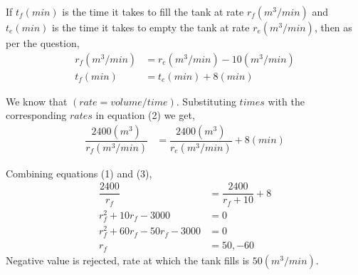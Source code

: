\begin{solution}[\halfpage]
  If $t_f(min)$ is the time it takes to fill the tank at rate $r_f(m^3/min)$ and $t_e(min)$ is the time it takes to empty the tank at rate $r_e(m^3/min)$, then as per the question,
  \begin{align}
    r_f(m^3/min) &= r_e(m^3/min) - 10(m^3/min) \\
    t_f(min)     &= t_e(min)+8(min)
  \end{align}
  
  We know that $(rate=volume/time)$. Substituting $times$ with the corresponding $rates$ in equation (2) we get,
  \begin{align}
    \dfrac{2400(m^3)}{r_f(m^3/min)} &= 
    	\dfrac{2400(m^3)}{r_e(m^3/min)}+8(min) 
  \end{align}
  
  Combining equations (1) and (3),
  \begin{align}      
    \dfrac{2400}{r_f}               &= \dfrac{2400}{r_f+10}+8 \\
    r_f^2 + 10r_f - 3000            &= 0 \\
    r_f^2 + 60r_f -50r_f - 3000     &= 0 \\
    r_f                             &= 50, -60
  \end{align}
  Negative value is rejected, rate at which the tank fills is $50(m^3/min)$.
\end{solution}

